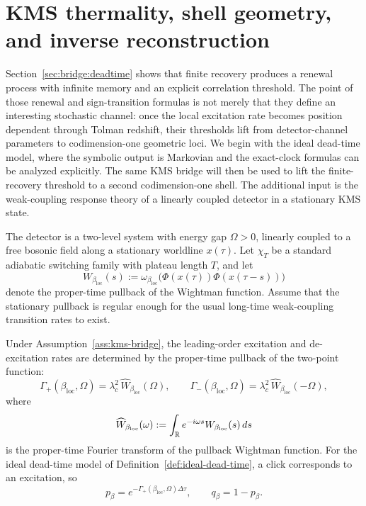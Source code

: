 \section{KMS thermality, shell geometry, and inverse reconstruction}\label{sec:bridge:kms}

Section~\ref{sec:bridge:deadtime} shows that finite recovery produces a renewal process with infinite memory and an explicit correlation threshold. The point of those renewal and sign-transition formulas is not merely that they define an interesting stochastic channel: once the local excitation rate becomes position dependent through Tolman redshift, their thresholds lift from detector-channel parameters to codimension-one geometric loci. We begin with the ideal dead-time model, where the symbolic output is Markovian and the exact-clock formulas can be analyzed explicitly. The same KMS bridge will then be used to lift the finite-recovery threshold to a second codimension-one shell. The additional input is the weak-coupling response theory of a linearly coupled detector in a stationary KMS state.

\begin{assumption}\label{ass:kms-bridge}
The detector is a two-level system with energy gap $\Omega>0$, linearly coupled to a free bosonic field along a stationary worldline $x(\tau)$. Let $\chi_T$ be a standard adiabatic switching family with plateau length $T$, and let
\[
W_{\beta_{\mathrm{loc}}}(s)
:=
\omega_{\beta_{\mathrm{loc}}}\!\bigl(\Phi(x(\tau))\Phi(x(\tau-s))\bigr)
\]
denote the proper-time pullback of the Wightman function. Assume that the stationary pullback is regular enough for the usual long-time weak-coupling transition rates to exist.
\end{assumption}

\begin{proposition}\label{prop:weak-coupling-rate}
Under Assumption~\ref{ass:kms-bridge}, the leading-order excitation and de-excitation rates are determined by the proper-time pullback of the two-point function:
\begin{equation}\label{eq:kms-weak-coupling-rates}
\Gamma_+(\beta_{\mathrm{loc}},\Omega)
=
\lambda_c^2\,\widehat{W}_{\beta_{\mathrm{loc}}}(\Omega),
\qquad
\Gamma_-(\beta_{\mathrm{loc}},\Omega)
=
\lambda_c^2\,\widehat{W}_{\beta_{\mathrm{loc}}}(-\Omega),
\end{equation}
where
\[
\widehat{W}_{\beta_{\mathrm{loc}}}(\omega)
:=
\int_{\mathbb{R}} e^{-i\omega s}W_{\beta_{\mathrm{loc}}}(s)\,ds
\]
is the proper-time Fourier transform of the pullback Wightman function. For the ideal dead-time model of Definition~\ref{def:ideal-dead-time}, a click corresponds to an excitation, so
\[
p_\beta=e^{-\Gamma_+(\beta_{\mathrm{loc}},\Omega)\Delta\tau},
\qquad
q_\beta=1-p_\beta.
\]
\end{proposition}

